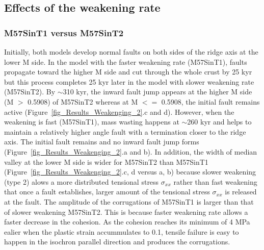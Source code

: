 \documentclass[draft,gc]{agutex}
\begin{document}
\begin{article}
\subsection{Effects of the weakening rate}
\subsubsection{M57SinT1 versus M57SinT2}
Initially, both models develop normal faults on both sides of the ridge axis at the lower M side. In the model with the faster weakening rate (M57SinT1), faults propagate toward the higher M side and cut through the whole crust by 25 kyr but this process completes 25 kyr later in the model with slower weakening rate (M57SinT2). By $\sim$310 kyr, the inward fault jump appears at the higher M side (M $>$ 0.5908) of M57SinT2 whereas at M $<=$ 0.5908, the initial fault remains active (Figure~\ref{fig_Results_Weakenging_2}.c and d). However, when the weakening is fast (M57SinT1), mass wasting happens at $\sim$260 kyr and helps to maintain a relatively higher angle fault with a termination closer to the ridge axis. The initial fault remains and no inward fault jump forms (Figure~\ref{fig_Results_Weakenging_2}.a and b). In addition, the width of median valley at the lower M side is wider for M57SinT2 than M57SinT1 (Figure~\ref{fig_Results_Weakenging_2}.c, d versus a, b) because slower weakening (type 2) alows a more distributed tensional stress $\sigma_{xx}$ rather than fast weakening that once a fault establishes, larger amount of the tensional stress $\sigma_{xx}$ is released at the fault. The amplitude of the corrugations of M57SinT1 is larger than that of slower weakening M57SinT2. This is because faster weakening rate allows a faster decrease in the cohesion. As the cohesion reaches its minimum of 4 MPa ealier when the plastic strain accummulates to 0.1, tensile failure is easy to happen in the isochron parallel direction and produces the corrugations.


\end{article}
\end{document}
